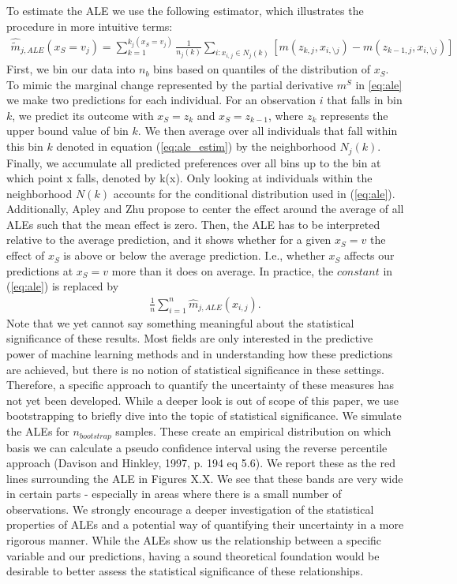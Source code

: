 To estimate the ALE we use the following estimator, which illustrates the procedure in more intuitive terms: 
\begin{align}
\hat{\tilde{m}}_{j, ALE}(x_S=v_j)=\sum_{k=1}^{k_j(x_S=v_j)} \frac{1}{n_j(k)}\sum_{i:x_{i,j}\in N_j(k)}[m(z_{k,j}, x_{i,\setminus j})-m(z_{k-1,j}, x_{i,\setminus j})] \label{eq:ale_estim}
\end{align}
First, we bin our data into $n_b$ bins based on quantiles of the distribution of $x_S$. To mimic the marginal change represented by the partial derivative $m^S$ in \ref{eq:ale} we make two predictions for each individual. For an observation $i$ that falls in bin $k$, we predict its outcome with $x_S=z_k$ and $x_S=z_{k-1}$, where $z_k$ represents the upper bound value of bin $k$. We then average over all individuals that fall within this bin $k$ denoted in equation (\ref{eq:ale_estim}) by the neighborhood $N_j(k)$. Finally, we accumulate all predicted preferences over all bins up to the bin at which point x falls, denoted by k(x). Only looking at individuals within the neighborhood $N(k)$ accounts for the conditional distribution used in (\ref{eq:ale}). \\
Additionally, Apley and Zhu propose to center the effect around the average of all ALEs such that the mean effect is zero. Then, the ALE has to be interpreted relative to the average prediction, and it shows whether for a given $x_S=v$ the effect of $x_S$ is above or below the average prediction. I.e., whether $x_S$ affects our predictions at $x_S=v$ more than it does on average. In practice, the $constant$ in (\ref{eq:ale}) is replaced by 
\begin{align*}
    \frac{1}{n}\sum_{i=1}^n \hat{m}_{j, ALE}(x_{i, j}).
\end{align*}
Note that we yet cannot say something meaningful about the statistical significance of these results. Most fields are only interested in the predictive power of machine learning methods and in understanding how these predictions are achieved, but there is no notion of statistical significance in these settings. Therefore, a specific approach to quantify the uncertainty of these measures has not yet been developed. While a deeper look is out of scope of this paper, we use bootstrapping to briefly dive into the topic of statistical significance. We simulate the ALEs for $n_{bootstrap}$ samples. These create an empirical distribution on which basis we can calculate a pseudo confidence interval using the reverse percentile approach (Davison and Hinkley, 1997, p. 194 eq 5.6). We report these as the red lines surrounding the ALE in Figures X.X. We see that these bands are very wide in certain parts - especially in areas where there is a small number of observations. We strongly encourage a deeper investigation of the statistical properties of ALEs and a potential way of quantifying their uncertainty in a more rigorous manner. While the ALEs show us the relationship between a specific variable and our predictions, having a sound theoretical foundation would be desirable to better assess the statistical significance of these relationships. 

